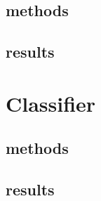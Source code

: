 \documentclass{article} %
\begin{document}
\subsection{methods}
\subsection{results}

\section{Classifier}

\subsection{methods}
\subsection{results}



%
\end{document}
